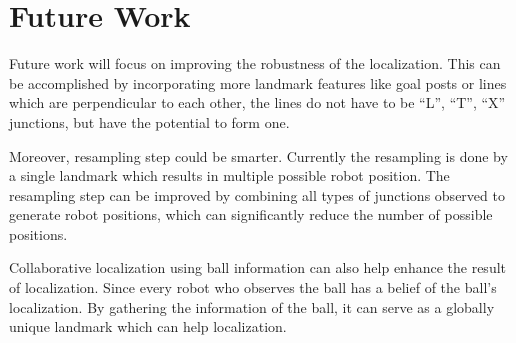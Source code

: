 \section{Future Work\label{sec:future}}
Future work will focus on improving the robustness of the localization. This can be accomplished by incorporating more landmark features like goal posts or lines which are perpendicular to each other, the lines do not have to be ``L'', ``T'', ``X'' junctions, but have the potential to form one.  

Moreover, resampling step could be smarter. Currently the resampling is done by a single landmark which results in multiple possible robot position. The resampling step can be improved by combining all types of junctions observed to generate robot positions, which can significantly reduce the number of possible positions.

Collaborative localization using ball information can also help enhance the result of localization. Since every robot who observes the ball has a belief of the ball's localization. By gathering the information of the ball, it can serve as a globally unique landmark which can help localization.
